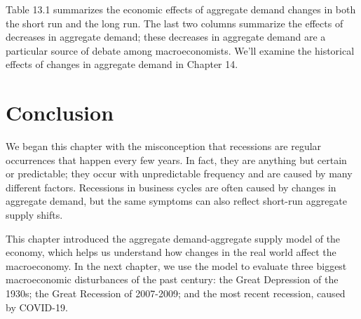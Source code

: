 \documentclass[11pt]{article} %
\begin{document}
Table 13.1 summarizes the economic effects of aggregate demand changes in both the short run and the long run. The last two columns summarize the effects of decreases in aggregate demand; these decreases in aggregate demand are a particular source of debate among macroeconomists. We'll examine the historical effects of changes in aggregate demand in Chapter 14.

\section*{\textbf{Conclusion}}
We began this chapter with the misconception that recessions are regular occurrences that happen every few years. In fact, they are anything but certain or predictable; they occur with unpredictable frequency and are caused by many different factors. Recessions in business cycles are often caused by changes in aggregate demand, but the same symptoms can also reflect short-run aggregate supply shifts.

This chapter introduced the aggregate demand-aggregate supply model of the economy, which helps us understand how changes in the real world affect the macroeconomy. In the next chapter, we use the model to evaluate three biggest macroeconomic disturbances of the past century: the Great Depression of the 1930s; the Great Recession of 2007-2009; and the most recent recession, caused by COVID-19.
\end{document}
